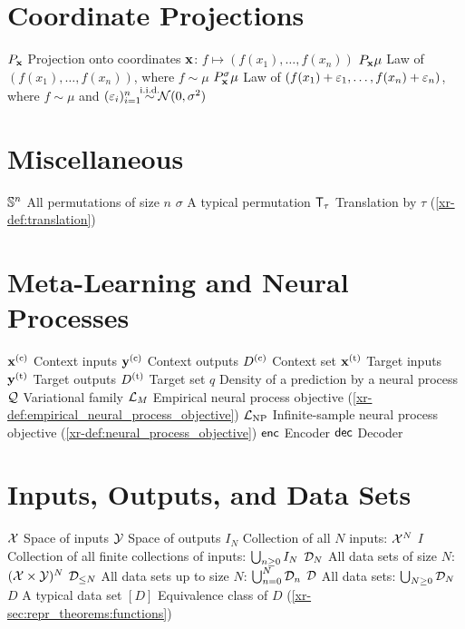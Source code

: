 \documentclass[12pt]{report}
\newcommand{\xrprefix}[1]{xr-#1}
\begin{document}
\section*{Coordinate Projections}
\entry
    {$P_{\mathbf{x}}$}
    {Projection onto coordinates $\mathbf{x}$: $f \mapsto (f({x_1}), \ldots, f(x_n))$}
\entry
    {$P_{\mathbf{x}} \mu$}
    {Law of $(f(x_1), \ldots, f(x_n))$, where $f \sim \mu$}
\entry
    {$P^\sigma_{\mathbf{x}} \mu$}
    {
        Law of $(f(x_1) + \varepsilon_1, \ldots, f(x_n) + \varepsilon_n)$,
        where $f \sim \mu$ and $(\e_i)_{i=1}^n \overset{\mathclap{\text{i.i.d.}}}{\sim} \Normal(0, \sigma^2)$
    }

\section*{Miscellaneous}
\entry
    {$\mathbb{S}^n$}
    {All permutations of size $n$}
\entry
    {$\sigma$}
    {A typical permutation}
\entry
    {$\T_\tau$}
    {Translation by $\tau$ (\cref{\xrprefix{def:translation}})}

\section*{Meta-Learning and Neural Processes}
\entry
    {$\vx\us{(c)}$}
    {Context inputs}
\entry
    {$\vy\us{(c)}$}
    {Context outputs}
\entry
    {$D\us{(c)}$}
    {Context set}
\entry
    {$\vx\us{(t)}$}
    {Target inputs}
\entry
    {$\vy\us{(t)}$}
    {Target outputs}
\entry
    {$D\us{(t)}$}
    {Target set}
\entry
    {$q$}
    {Density of a prediction by a neural process}
\entry
    {$\mathcal{Q}$}
    {Variational family}
\entry
    {$\mathcal{L}_M$}
    {Empirical neural process objective (\cref{\xrprefix{def:empirical_neural_process_objective}})}
\entry
    {$\L\ss{NP}$}
    {Infinite-sample neural process objective (\cref{\xrprefix{def:neural_process_objective}})}
\entry
    {$\mathsf{enc}$}
    {Encoder}
\entry
    {$\mathsf{dec}$}
    {Decoder}


\section*{Inputs, Outputs, and Data Sets}
\entry
    {$\mathcal{X}$}
    {Space of inputs}
\entry
    {$\mathcal{Y}$}
    {Space of outputs}
\entry
    {$I_N$}
    {Collection of all $N$ inputs: $\mathcal{X}^N$}
\entry
    {$I$}
    {Collection of all finite collections of inputs: $\bigcup_{n \ge 0} I_N$}
\entry
    {$\mathcal{D}_N$}
    {All data sets of size $N$: $(\mathcal{X} \times \mathcal{Y})^N$}
\entry
    {$\mathcal{D}_{\le N}$}
    {All data sets up to size $N$: $\bigcup_{n = 0}^N \mathcal{D}_n$}
\entry
    {$\mathcal{D}$}
    {All data sets: $\bigcup_{N \ge 0} \mathcal{D}_N$}
\entry
    {$D$}
    {A typical data set}
\entry
    {$[D]$}
    {Equivalence class of $D$ (\cref{\xrprefix{sec:repr_theorems:functions}})}
\end{document}
